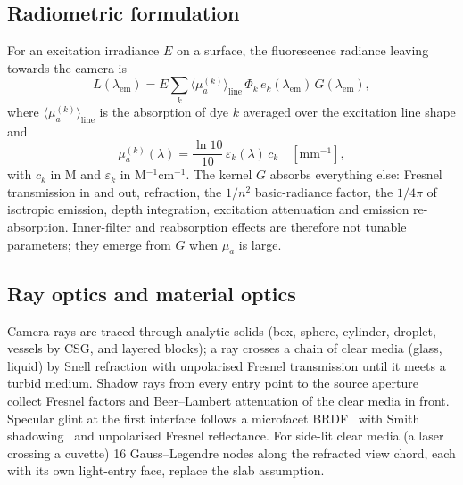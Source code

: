 \documentclass[journal]{IEEEtran}
\newcommand{\mua}{\mu_a}
\newcommand{\lem}{\lambda_{\mathrm{em}}}
\begin{document}
\subsection{Radiometric formulation}
For an excitation irradiance $E$ on a surface, the fluorescence radiance leaving towards the camera is
\begin{equation}
L(\lem)=E\sum_k \langle\mua^{(k)}\rangle_{\mathrm{line}}\,\Phi_k\,e_k(\lem)\,G(\lem),
\label{eq:radiance}
\end{equation}
where $\langle\mua^{(k)}\rangle_{\mathrm{line}}$ is the absorption of dye $k$ averaged over the excitation line shape and
\begin{equation}
\mua^{(k)}(\lambda)=\frac{\ln 10}{10}\,\varepsilon_k(\lambda)\,c_k\quad[\mathrm{mm^{-1}}],
\label{eq:mua_dye}
\end{equation}
with $c_k$ in M and $\varepsilon_k$ in M$^{-1}$cm$^{-1}$. The kernel $G$ absorbs everything else: Fresnel transmission in and out, refraction, the $1/n^2$ basic-radiance factor, the $1/4\pi$ of isotropic emission, depth integration, excitation attenuation and emission re-absorption. Inner-filter and reabsorption effects are therefore not tunable parameters; they emerge from $G$ when $\mua$ is large.

\subsection{Ray optics and material optics}
Camera rays are traced through analytic solids (box, sphere, cylinder, droplet, vessels by CSG, and layered blocks); a ray crosses a chain of clear media (glass, liquid) by Snell refraction with unpolarised Fresnel transmission until it meets a turbid medium. Shadow rays from every entry point to the source aperture collect Fresnel factors and Beer--Lambert attenuation of the clear media in front. Specular glint at the first interface follows a microfacet BRDF~\cite{cook1982} with Smith shadowing~\cite{smith1967} and unpolarised Fresnel reflectance. For side-lit clear media (a laser crossing a cuvette) 16 Gauss--Legendre nodes along the refracted view chord, each with its own light-entry face, replace the slab assumption.
\end{document}
